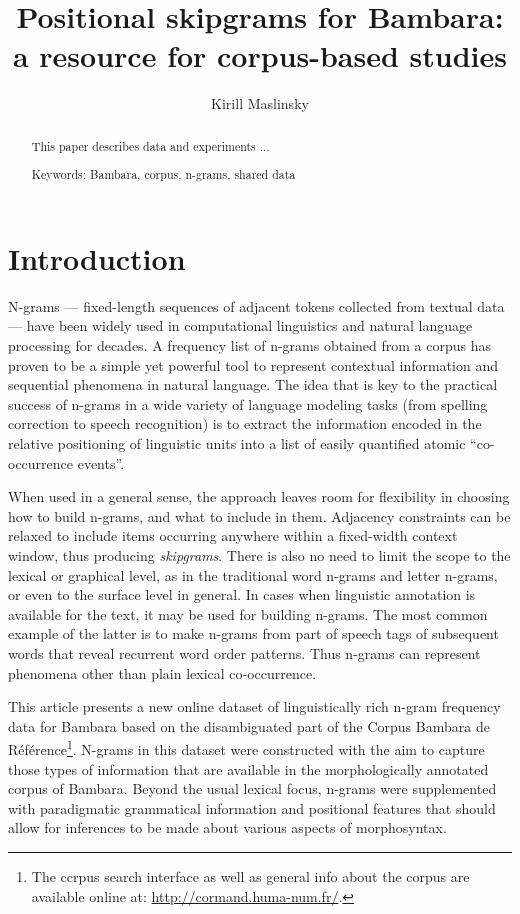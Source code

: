 \documentclass[12pt]{article}
\author{Kirill Maslinsky}
\title{Positional skipgrams for Bambara: a resource for corpus-based studies}
\begin{document}
\maketitle

\begin{abstract}
  This paper describes data and experiments ...


  Keywords: Bambara, corpus, n-grams, shared data
\end{abstract}

\section{Introduction}

N-grams — fixed-length sequences of adjacent tokens collected from
textual data — have been widely used in computational linguistics and
natural language processing for decades. A frequency list of n-grams
obtained from a corpus has proven to be a simple yet powerful tool to
represent contextual information and sequential phenomena in natural
language.  The idea that is key to the practical success of n-grams in
a wide variety of language modeling tasks (from spelling correction to
speech recognition) is to extract the information encoded in the relative
positioning of linguistic units into a list of easily quantified
atomic “co-occurrence events”.

When used in a general sense, the approach leaves room for flexibility in
choosing how to build n-grams, and what to include in them. Adjacency
constraints can be relaxed to include items occurring anywhere within
a fixed-width context window, thus producing \textit{skipgrams}. There
is also no need to limit the scope to the lexical or graphical level,
as in the traditional word n-grams and letter n-grams, or even to the
surface level in general. In cases when linguistic annotation is
available for the text, it may be used for building n-grams. The most
common example of the latter is to make n-grams from part of speech
tags of subsequent words that reveal recurrent word order patterns.
Thus n-grams can represent phenomena other than plain lexical
co-occurrence.

This article presents a new online dataset of linguistically rich
n-gram frequency data for Bambara based on the
disambiguated part of the Corpus Bambara de
R\'ef\'erence\footnote{The ccrpus search interface as well as general info
  about the corpus are available online at:
  \url{http://cormand.huma-num.fr/}.}. N-grams in this
dataset were constructed with the aim to capture those types of
information that are available in the morphologically annotated corpus
of Bambara.  Beyond the usual lexical focus, n-grams were supplemented
with paradigmatic grammatical information and positional
features that should allow for inferences to be made about
various aspects of morphosyntax. %
\end{document}
